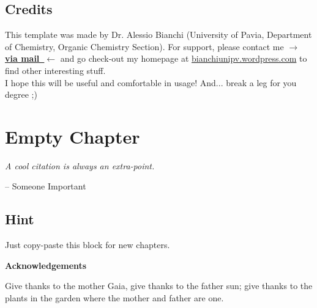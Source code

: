 \documentclass[12pt,a4paper,twoside]{book}
\begin{document}
\section*{Credits}
This template was made by Dr. Alessio Bianchi (University of Pavia, Department of Chemistry, Organic Chemistry Section). For support, please contact me \href{mailto:alessio.bianchi02@universitadipavia.it}{\bf \color{reddy}$\to$ via mail~$\leftarrow$} and go check-out my homepage at \href{https://bianchiunipv.wordpress.com/}{\color{reddy} bianchiunipv.wordpress.com} to find other interesting stuff.\newline \\
I hope this will be useful and comfortable in usage! And... break a leg for you degree ;)

	\chapter*{Empty Chapter} 
	\epigraph{\it A cool citation is always an extra-point.}{-- Someone Important}
	\minitoc
\section*{Hint}
Just copy-paste this block for new chapters.

\backmatter %
\pagestyle{plain}
\begin{footnotesize}
\printbibliography
\end{footnotesize}
\newpage
\listoffigures
{}
\listoftables
{}
\newpage
\vspace*{1.5cm}
\begin{flushright}
\begin{minipage}{.9\textwidth}
{\bf \LARGE\hfill\color{reddy}  Acknowledgements} \vspace{20 pt}\\
Give thanks to the mother Gaia, give thanks to the father sun; give thanks to the plants in the garden where the mother and father are one.
\end{minipage}
\end{flushright}
\end{document}
